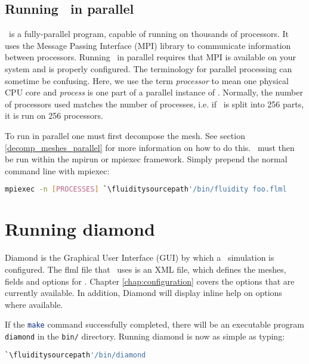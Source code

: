 \subsection{Running \fluidity\ in parallel}
\label{sec:running_fluidity_in_parallel}

\fluidity\ is a fully-parallel program, capable of running on thousands of
processors.  It uses the Message Passing Interface (MPI) library to communicate
information between processors. Running \fluidity\ in parallel requires that
MPI is available on your system and is properly configured. The terminology for
parallel processing can sometime be confusing.  Here, we use the term
\emph{processor} to mean one physical CPU core and \emph{process} is one part
of a parallel instance of \fluidity. Normally, the number of processors used
matches the number of processes, i.e. if \fluidity\ is split into 256 parts, it
is run on 256 processors.

To run in parallel one must first decompose the mesh. See section
\ref{decomp_meshes_parallel} for more information on how to do this. \fluidity\
must then be run within the mpirun or mpiexec framework. Simply prepend the
normal command line with mpiexec:
\begin{lstlisting}[language=bash]
mpiexec -n [PROCESSES] `\fluiditysourcepath'/bin/fluidity foo.flml
\end{lstlisting}

\section{Running diamond}
\label{sec:running_diamond}

Diamond is the Graphical User Interface (GUI) by which a \fluidity\ simulation
is configured. The flml file that \fluidity\ uses is an XML file, which defines
the meshes, fields and options for \fluidity. Chapter \ref{chap:configuration}
covers the options that are currently available. In addition, Diamond will
display inline help on options where available.

If the \lstinline[language=Bash]+make+ command successfully completed, there
will be an executable program \lstinline[language=Bash]+diamond+ in the
\lstinline[language=Bash]+bin/+ directory. Running diamond is now as simple as
typing:

\begin{lstlisting}[language=Bash]
`\fluiditysourcepath'/bin/diamond
\end{lstlisting}

